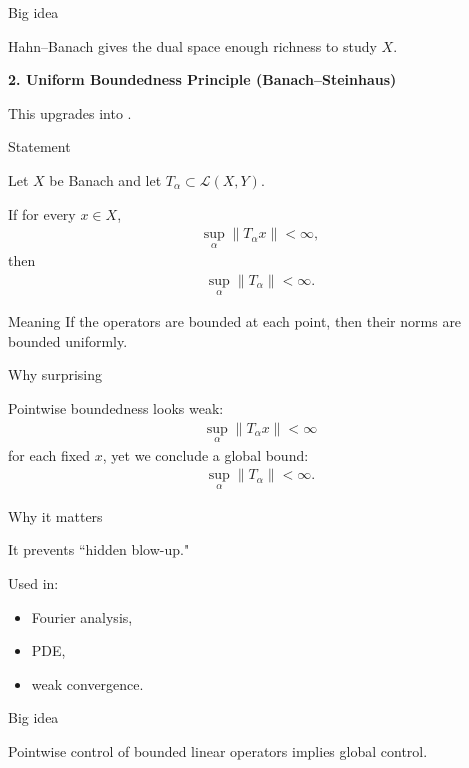 \documentclass[12pt,a4paper]{report}
\begin{document}
\begin{description}
\begin{description}
    \item Big idea

\> Hahn–Banach gives the dual space enough richness to study $X$.
	\end{description}

\item \textbf{2. Uniform Boundedness Principle (Banach–Steinhaus)}

This upgrades  into .

	\begin{description}
    \item Statement

Let $X$ be Banach and let ${T_\alpha}\subset \mathcal L(X,Y)$.

If for every $x\in X$,
\begin{align*}
\sup_\alpha \|T_\alpha x\|<\infty,
\end{align*}
then
\begin{align*}
\sup_\alpha \|T_\alpha\|<\infty.
\end{align*}

    \item Meaning
If the operators are bounded at each point, then their norms are bounded uniformly.

    \item Why surprising

Pointwise boundedness looks weak:
\begin{align*}
\sup_\alpha \|T_\alpha x\|<\infty
\end{align*}
for each fixed $x$,
yet we conclude a global bound:
\begin{align*}
\sup_\alpha \|T_\alpha\|<\infty.
\end{align*}

    \item Why it matters

It prevents ``hidden blow-up."

Used in:
	\begin{itemize}
    \item Fourier analysis,
    \item PDE,
    \item weak convergence.
	\end{itemize}

    \item Big idea

\> Pointwise control of bounded linear operators implies global control.
	\end{description}


\end{description}
\end{document}
